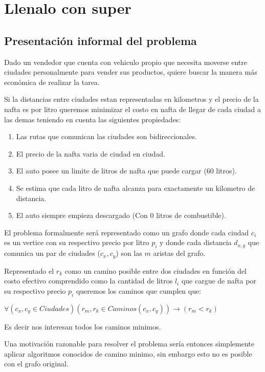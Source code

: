 \documentclass[12pt]{article}
\begin{document}
\section{Llenalo con super}

\subsection{Presentación informal del problema}
Dado un vendedor que cuenta con vehiculo propio que necesita moverse entre ciudades personalmente para vender sus productos, quiere buscar la manera más económica de realizar la tarea.

Si la distancias entre ciudades estan representadas en kilometros y el precio de la nafta es por litro queremos minimizar el costo en nafta de llegar de cada ciudad a las demas teniendo en cuenta las siguientes propiedades: 

\begin{enumerate}
	\item Las rutas que comunican las ciudades son bidireccionales.
	\item El precio de la nafta varia de ciudad en ciudad.
	\item El auto posee un limite de litros de nafta que puede cargar (60 litros).
	\item Se estima que cada litro de nafta alcanza para exactamente un kilometro de distancia.
	\item El auto siempre empieza descargado (Con 0 litros de combustible).
\end{enumerate}

El problema formalmente será representado como un grafo donde cada ciudad $c_i$ es un vertice con su respectivo precio por litro $p_i$ y donde cada distancia $d_{x,y}$ que comunica un par de ciudades ($c_x, c_y$) son las $m$ aristas del grafo.

Representado el $r_k$ como un camino posible entre dos ciudades en función del costo efectivo comprendido como la cantidad de litros $l_i$ que cargue de nafta por su respectivo precio $p_i$ queremos los caminos que cumplen que:

$\forall(c_x, c_y \in Ciudades)(r_{m}, r_k \in Caminos(c_x,c_y))\rightarrow(r_{m} < r_k)$

Es decir nos interesan todos los caminos minimos.

Una motivación razonable para resolver el problema sería entonces simplemente aplicar algoritmos conocidos de camino minimo, sin embargo esto no es posible con el grafo original.
\end{document}
